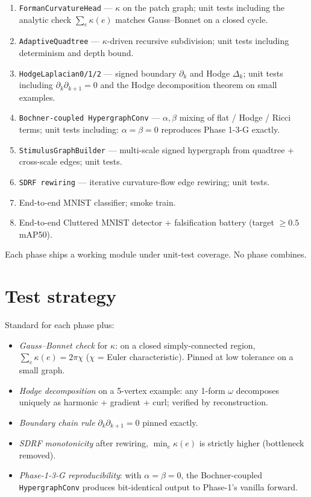 \documentclass[11pt,a4paper]{article}
\begin{document}
\begin{enumerate}
\item \texttt{FormanCurvatureHead} --- $\kappa$ on the patch graph; unit tests including the analytic check $\sum_e \kappa(e)$ matches Gauss--Bonnet on a closed cycle.
\item \texttt{AdaptiveQuadtree} --- $\kappa$-driven recursive subdivision; unit tests including determinism and depth bound.
\item \texttt{HodgeLaplacian0/1/2} --- signed boundary $\partial_k$ and Hodge $\Delta_k$; unit tests including $\partial_{k} \partial_{k+1} = 0$ and the Hodge decomposition theorem on small examples.
\item \texttt{Bochner-coupled \texttt{HypergraphConv}} --- $\alpha, \beta$ mixing of flat / Hodge / Ricci terms; unit tests including: $\alpha = \beta = 0$ reproduces Phase 1-3-G exactly.
\item \texttt{StimulusGraphBuilder} --- multi-scale signed hypergraph from quadtree + cross-scale edges; unit tests.
\item \texttt{SDRF rewiring} --- iterative curvature-flow edge rewiring; unit tests.
\item End-to-end MNIST classifier; smoke train.
\item End-to-end Cluttered MNIST detector + falsification battery (target $\geq 0.5$ mAP50).
\end{enumerate}

Each phase ships a working module under unit-test coverage. No phase combines.

\section{Test strategy}

Standard for each phase plus:

\begin{itemize}
\item \emph{Gauss--Bonnet check} for $\kappa$: on a closed simply-connected region, $\sum_e \kappa(e) = 2\pi \chi$ ($\chi$ = Euler characteristic). Pinned at low tolerance on a small graph.
\item \emph{Hodge decomposition} on a 5-vertex example: any 1-form $\omega$ decomposes uniquely as harmonic + gradient + curl; verified by reconstruction.
\item \emph{Boundary chain rule} $\partial_k \partial_{k+1} = 0$ pinned exactly.
\item \emph{SDRF monotonicity} after rewiring, $\min_e \kappa(e)$ is strictly higher (bottleneck removed).
\item \emph{Phase-1-3-G reproducibility}: with $\alpha = \beta = 0$, the Bochner-coupled \texttt{HypergraphConv} produces bit-identical output to Phase-1's vanilla forward.
\end{itemize}
\end{document}
